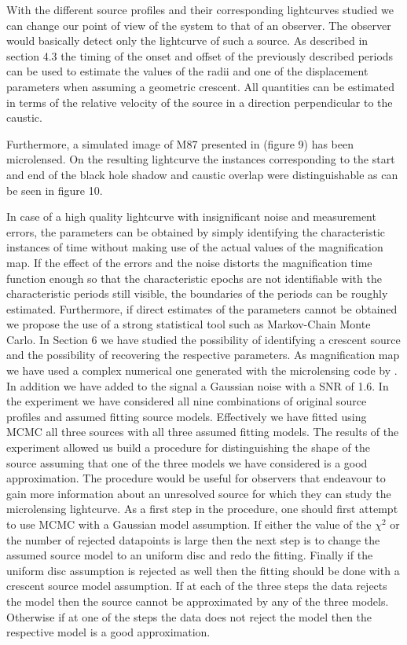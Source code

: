 \documentclass[usenatbib]{mn2e}
\begin{document}
With the different source profiles and their corresponding lightcurves studied we can change our point of view of the system to that of an observer. 
The observer would basically detect only the lightcurve of such a source. As described in section 4.3 the timing of the onset and offset of the previously 
described periods can be used to estimate the values of the radii and one of the displacement parameters when assuming a geometric crescent. 
All quantities can be estimated in terms of the relative velocity of the source in a direction perpendicular to the caustic.


Furthermore, a simulated image of M87 presented in \citep{2012MNRAS.421.1517D} (figure 9) has been microlensed. On the resulting lightcurve the instances 
corresponding to the start and end of the black hole shadow and caustic overlap were distinguishable as can be seen in figure 10.
    

In case of a high quality lightcurve with insignificant noise and measurement errors, the parameters can be obtained 
by simply identifying the characteristic instances of time without making use of the actual values of the magnification
 map. If the effect of the errors and the noise distorts the magnification time function enough so that the 
characteristic epochs are not identifiable with the characteristic periods still visible, the boundaries of the periods 
can be roughly estimated. Furthermore, if direct estimates of the parameters cannot be obtained we propose the use of a strong
statistical tool such as Markov-Chain Monte Carlo. In Section 6  we have studied the possibility of identifying a crescent 
source and  the possibility of recovering the respective parameters. As magnification map we have used a complex numerical 
one generated with the microlensing code by \cite{1999A&A...346L...5W}. In addition we have added to the signal a Gaussian 
noise with a SNR of 1.6.  In the experiment we have considered all nine combinations of original source profiles and assumed fitting source models.
Effectively we have fitted using MCMC all three sources with all three assumed fitting models. The results of the experiment allowed us build a 
procedure for distinguishing the shape of the source assuming that one of the three models we have considered is a good approximation.  
The procedure would be useful for observers that endeavour to gain more information about an unresolved source for which they can study 
the microlensing lightcurve.  As a first step in the procedure, one should first attempt to use MCMC with a Gaussian model assumption. 
If either the value of the $\chi^2$ or the number of rejected datapoints is large then the next step is to change the assumed source model to 
an uniform disc and redo the fitting. Finally if the uniform disc assumption is rejected as well then the fitting should be done with a 
crescent source model assumption. If at each of the three steps the data rejects the model then the source cannot be approximated by any of the three models. 
Otherwise if at one of the steps the data does not reject the model then the respective model is a good approximation.   
\end{document}
